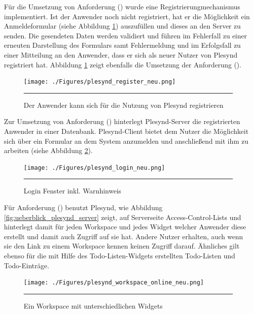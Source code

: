 Für die Umsetzung von Anforderung  (\emph{\requirementRegistrieren}) wurde eine Registrierungmechanismus implementiert. Ist der Anwender noch nicht registriert, hat er die Möglichkeit ein Anmeldeformular (siehe Abbildung \ref{fig:plesynd_register}) auszufüllen und dieses an den Server zu senden. Die gesendeten Daten werden validiert und führen im Fehlerfall zu einer erneuten Darstellung des Formulars samt Fehlermeldung und im Erfolgsfall zu einer Mitteilung an den Anwender, dass er sich als neuer Nutzer von Plesynd registriert hat. Abbildung \ref{fig:plesynd_register} zeigt ebenfalls die Umsetzung der Anforderung  (\emph{\requirementUniqueLoginEmail}). 
\begin{figure}
  \centering
  \texttt{[image: ./Figures/plesynd\_register\_neu.png]}
    \rule{35em}{0.5pt}
  \caption[Plesynd User"=Interface: Registrieren]{Der Anwender kann sich für die Nutzung von Plesynd registrieren}
  \label{fig:plesynd_register}
\end{figure}
Zur Umsetzung von Anforderung  (\emph{\requirementLogin}) hinterlegt Plesynd-Server die registrierten Anwender in einer Datenbank. Plesynd-Client bietet dem Nutzer die Möglichkeit sich über ein Formular an dem System anzumelden und anschließend mit ihm zu arbeiten (siehe Abbildung \ref{fig:plesynd_login}).
\begin{figure}
  \centering
  \texttt{[image: ./Figures/plesynd\_login\_neu.png]}
    \rule{35em}{0.5pt}
  \caption[Plesynd User"=Interface: Login]{Login Fenster inkl. Warnhinweis}
  \label{fig:plesynd_login}
\end{figure}
Für Anforderung  (\emph{\requirementZugriffAufEigeneWidgets}) benutzt Plesynd, wie Abbildung \ref{fig:ueberblick_plesynd_server} zeigt, auf Serverseite Access-Control-Lists und hinterlegt damit für jeden Workspace und jedes Widget welcher Anwender diese erstellt und damit auch Zugriff auf sie hat. Andere Nutzer erhalten, auch wenn sie den Link zu einem Workspace kennen keinen Zugriff darauf. Ähnliches gilt ebenso für die mit Hilfe des Todo-Listen-Widgets erstellten Todo-Listen und Todo-Einträge. 
\begin{figure}[!ht]
  \centering
  \texttt{[image: ./Figures/plesynd\_workspace\_online\_neu.png]}
    \rule{35em}{0.5pt}
  \caption[Plesynd User"=Interface: Workspace Online]{Ein Workspace mit unterschiedlichen Widgets}
  \label{fig:plesynd_workspace_online}
\end{figure}
